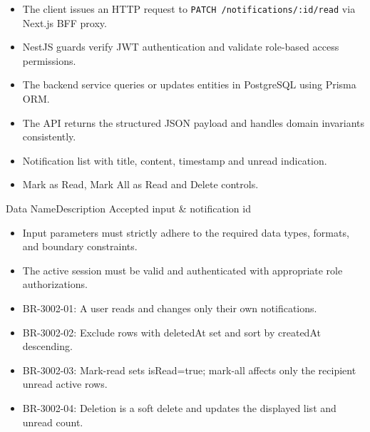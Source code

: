 \begin{itemize}[leftmargin=1.6em,topsep=3pt,itemsep=2pt,parsep=0pt,label=$\bullet$]
    \item The client issues an HTTP request to \texttt{PATCH /\allowbreak{}notifications/\allowbreak{}:\allowbreak{}id/\allowbreak{}read} via Next.js BFF proxy.
    \item NestJS guards verify JWT authentication and validate role-based access permissions.
    \item The backend service queries or updates entities in PostgreSQL using Prisma ORM.
    \item The API returns the structured JSON payload and handles domain invariants consistently.
\end{itemize}

\begin{itemize}[leftmargin=1.6em,topsep=3pt,itemsep=2pt,parsep=0pt,label=$\bullet$]
    \item Notification list with title, content, timestamp and unread indication.
    \item Mark as Read, Mark All as Read and Delete controls.
\end{itemize}


\begin{specdatatable}{Data Name}{Description}
Accepted input & notification id\\ \hline
\end{specdatatable}

\begin{itemize}[leftmargin=1.6em,topsep=3pt,itemsep=2pt,parsep=0pt,label=$\bullet$]
    \item Input parameters must strictly adhere to the required data types, formats, and boundary constraints.
    \item The active session must be valid and authenticated with appropriate role authorizations.
\end{itemize}

\begin{itemize}[leftmargin=1.6em,topsep=3pt,itemsep=2pt,parsep=0pt,label=$\bullet$]\brrulelist
    \item BR-3002-01: A user reads and changes only their own notifications.
    \item BR-3002-02: Exclude rows with deletedAt set and sort by createdAt descending.
    \item BR-3002-03: Mark-read sets isRead=true; mark-all affects only the recipient unread active rows.
    \item BR-3002-04: Deletion is a soft delete and updates the displayed list and unread count.
\end{itemize}

